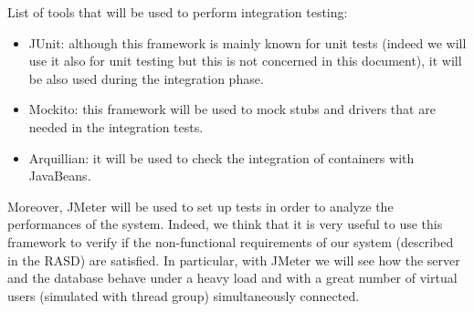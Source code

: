 List of tools that will be used to perform integration testing:
\begin{itemize}
    \item JUnit: although this framework is mainly known for unit tests (indeed we will use it also for unit testing but this is not concerned in this document), it will be also used during the integration phase.
    \item Mockito: this framework will be used to mock stubs and drivers that are needed in the integration tests.
    \item Arquillian: it will be used to check the integration of containers with JavaBeans.
\end{itemize}
Moreover, JMeter will be used to set up tests in order to analyze the performances of the system. Indeed, we think that it is very useful to use this framework to verify if the non-functional requirements of our system (described in the RASD) are satisfied.
\newline
In particular, with JMeter we will see how the server and the database behave under a heavy load and with a great number of virtual users (simulated with thread group) simultaneously connected.